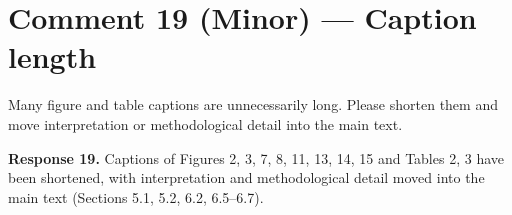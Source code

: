 \section*{Comment 19 (Minor) — Caption length}

\begin{quoting}
Many figure and table captions are unnecessarily long. Please shorten them and move interpretation or methodological detail into the main text.
\end{quoting}

\textbf{Response 19.} Captions of Figures 2, 3, 7, 8, 11, 13, 14, 15 and Tables 2, 3 have been shortened, with interpretation and methodological detail moved into the main text (Sections 5.1, 5.2, 6.2, 6.5–6.7).
